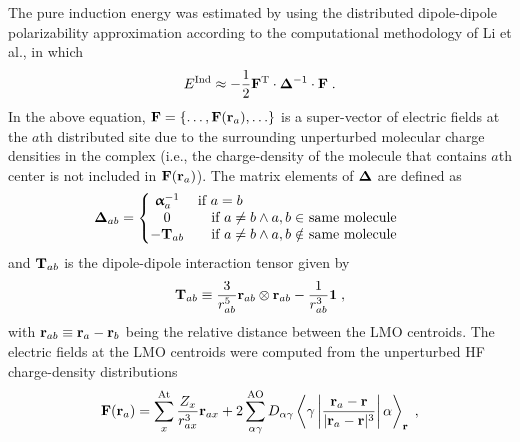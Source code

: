 \documentclass[aip,jcp,amsmath,amssymb,reprint,floatfix]{revtex4-1}
\begin{document}
The pure induction energy was estimated by using the distributed
dipole\hyp{}dipole polarizability approximation according to the computational
methodology of Li et al.,\cite{Li.Netzloff.Gordon.JCP.2006}
in which
%
\begin{equation}\label{e:ind-ref}
 E^{\rm Ind} \approx - \frac{1}{2} {\bf F}^{\rm T} \cdot {\bm{\Delta}}^{-1} \cdot {\bf F} \;.
\end{equation}
%
In the above equation, ${\bf F} = \{ \ldots, {\bf F}({\bf r}_a), \ldots\}$
is a super\hyp{}vector of electric fields at the $a$th distributed site
due to the surrounding unperturbed molecular charge densities in the complex
(i.e., the charge\hyp{}density of the molecule that contains $a$th center
is not included in ${\bf F}({\bf r}_a)$).
The matrix elements of ${\bm{\Delta}}$ are defined as
%
\begin{equation} \label{e:ind-ref.d-matrix}
 {\bm{\Delta}}_{ab} = 
\left\{\begin{matrix}
{\bm{\upalpha}}_a^{-1} &\text{if $a=b$}\qquad\qquad\qquad\qquad\qquad\qquad \\ 
0                    &\text{if $a\ne b \land a,b \in$ same molecule}\\ 
-{\bf T}_{ab}        &\text{if $a\ne b \land a,b \notin$ same molecule}&
\end{matrix}\right.
\end{equation}
%
and ${\bf T}_{ab}$ is the dipole\hyp{}dipole interaction tensor
given by
%
\begin{equation} \label{e:ind-ref.t-matrix}
 {\bf T}_{ab} \equiv \frac{3}{r_{ab}^5} {\bf r}_{ab} \otimes {\bf r}_{ab}
  - \frac{1}{r_{ab}^3} {\bf 1} \;,
\end{equation}
%
with ${\bf r}_{ab} \equiv {\bf r}_{a} - {\bf r}_{b}$ being the
relative distance between the LMO centroids.
The electric fields at the LMO centroids were computed from
the unperturbed HF charge\hyp{}density distributions
%
\begin{equation} \label{e:ind-ref.efield}
 {\bf F}({\bf r}_a) = \sum_x^{\rm At} \frac{Z_x}{r_{ax}^3} {\bf r}_{ax} 
  + 2 \sum_{\alpha\gamma}^{\rm AO} D_{\alpha\gamma} 
  \left< \gamma \left| 
    \frac{{\bf r}_a - {\bf r}}{\vert {\bf r}_a - {\bf r} \vert^3}
               \right| \alpha \right>_{\bf r} \;,
\end{equation}
\end{document}

